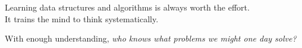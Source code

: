 \documentclass[../main.tex]{subfiles}
\begin{document}

Learning data structures and algorithms is always worth the effort. \\
It trains the mind to think systematically.

With enough understanding, \textit{who knows what problems we might one day solve?}
\end{document}
